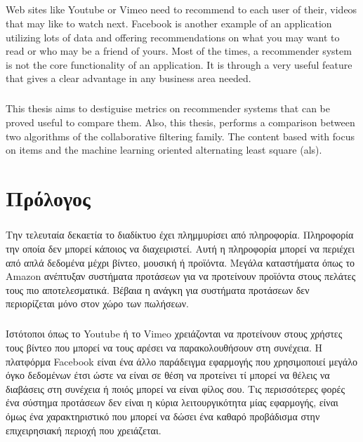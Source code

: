 \documentclass[12pt, a4paper, oneside, greek]{report}
\begin{document}
	\paragraph{}Web sites like Youtube or Vimeo need to recommend to each user of their, videos that may like to watch next. Facebook is another example of an application utilizing lots of data and offering recommendations on what you may want to read or who may be a friend of yours. Most of the times, a recommender system is not the core functionality of an application. It is through a very useful feature that gives a clear advantage in any business area needed.
	
	\paragraph{} This thesis aims to destiguise metrics on recommender systems  that can be proved useful to compare them. Also, this thesis, performs a comparison between two algorithms of the collaborative filtering family. The content based with focus on items and the machine learning oriented alternating least square (als).
	\newpage
	\chapter*{Πρόλογος}
	\paragraph{} Την τελευταία δεκαετία το διαδίκτυο έχει πλημμυρίσει από πληροφορία. Πληροφορία την οποία δεν μπορεί κάποιος να διαχειριστεί. Αυτή η πληροφορία μπορεί να περιέχει από απλά δεδομένα μέχρι βίντεο, μουσική ή προϊόντα. Μεγάλα καταστήματα όπως το Amazon ανέπτυξαν συστήματα προτάσεων για να προτείνουν προϊόντα στους πελάτες τους πιο αποτελεσματικά. Βέβαια η ανάγκη για συστήματα προτάσεων δεν περιορίζεται μόνο στον χώρο των πωλήσεων.
	
	\paragraph{} Ιστότοποι όπως το Youtube ή το Vimeo χρειάζονται να προτείνουν στους χρήστες τους βίντεο που μπορεί να τους αρέσει να παρακολουθήσουν στη συνέχεια. Η πλατφόρμα Facebook είναι ένα άλλο παράδειγμα εφαρμογής που χρησιμοποιεί μεγάλο όγκο δεδομένων έτσι ώστε να είναι σε θέση να προτείνει τί μπορεί να θέλεις να διαβάσεις στη συνέχεια ή ποιός μπορεί να είναι φίλος σου. Τις περισσότερες φορές ένα σύστημα προτάσεων δεν είναι η κύρια λειτουργικότητα μίας εφαρμογής, είναι όμως ένα χαρακτηριστικό που μπορεί να δώσει ένα καθαρό προβάδισμα στην επιχειρησιακή περιοχή που χρειάζεται.
	
\end{document}
